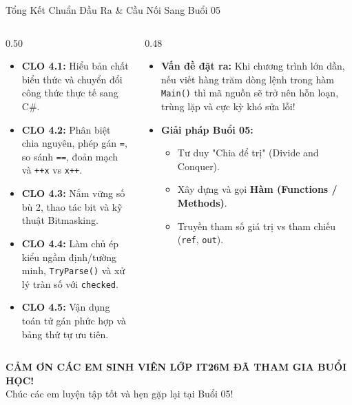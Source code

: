 \documentclass[aspectratio=169, 10pt]{beamer}
\begin{document}
\begin{frame}{Tổng Kết Chuẩn Đầu Ra \& Cầu Nối Sang Buổi 05}
  \begin{columns}[T]
    \begin{column}{0.50\textwidth}
      \begin{tcolorbox}[colback=UniLightBlue!30,colframe=UniBlue,title=\textbf{Checklist Hoàn thành Chuẩn đầu ra},fonttitle=\small\bfseries]
        \begin{itemize}\small
          \item[$\checkmark$] \textbf{CLO 4.1:} Hiểu bản chất biểu thức và chuyển đổi công thức thực tế sang C\#.
          \item[$\checkmark$] \textbf{CLO 4.2:} Phân biệt chia nguyên, phép gán \texttt{=}, so sánh \texttt{==}, đoản mạch và \texttt{++x} vs \texttt{x++}.
          \item[$\checkmark$] \textbf{CLO 4.3:} Nắm vững số bù 2, thao tác bit và kỹ thuật Bitmasking.
          \item[$\checkmark$] \textbf{CLO 4.4:} Làm chủ ép kiểu ngầm định/tường minh, \texttt{TryParse()} và xử lý tràn số với \texttt{checked}.
          \item[$\checkmark$] \textbf{CLO 4.5:} Vận dụng toán tử gán phức hợp và bảng thứ tự ưu tiên.
        \end{itemize}
      \end{tcolorbox}
    \end{column}

    \begin{column}{0.48\textwidth}
      \begin{tcolorbox}[colback=CSharpPurple!10,colframe=CSharpPurple,title=\textbf{Cầu nối sang Buổi 05 (Hàm \& Thủ tục)},fonttitle=\small\bfseries]
        \begin{itemize}\small
          \item \textbf{Vấn đề đặt ra:} Khi chương trình lớn dần, nếu viết hàng trăm dòng lệnh trong hàm \texttt{Main()} thì mã nguồn sẽ trở nên hỗn loạn, trùng lặp và cực kỳ khó sửa lỗi!
          \item \textbf{Giải pháp Buổi 05:}
            \begin{itemize}\footnotesize
              \item Tư duy "Chia để trị" (Divide and Conquer).
              \item Xây dựng và gọi \textbf{Hàm (Functions / Methods)}.
              \item Truyền tham số giá trị vs tham chiếu (\texttt{ref}, \texttt{out}).
            \end{itemize}
        \end{itemize}
      \end{tcolorbox}
    \end{column}
  \end{columns}

  \begin{center}
    \vspace{2mm}
    \large \textbf{CẢM ƠN CÁC EM SINH VIÊN LỚP IT26M ĐÃ THAM GIA BUỔI HỌC!}\\
    \small \color{gray} Chúc các em luyện tập tốt và hẹn gặp lại tại Buổi 05!
  \end{center}
\end{frame}
\end{document}
